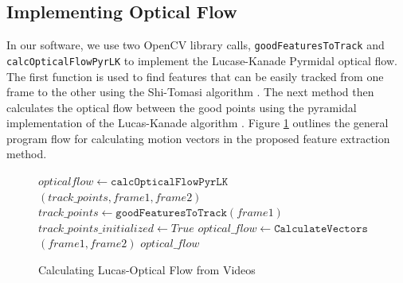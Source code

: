 %
%
%


\subsection{\label{subsection:vida_oflow} Implementing Optical Flow }
In our software, we use two OpenCV library calls, \texttt{goodFeaturesToTrack}
and \\
\texttt{calcOpticalFlowPyrLK} to implement the Lucase-Kanade Pyrmidal optical
flow. The first function is used to find features that can be easily tracked
from one frame to the other using the Shi-Tomasi algorithm \cite{shi1994good}.
The next method then calculates the optical flow between the good points using
the pyramidal implementation of the Lucas-Kanade algorithm
\cite{bouguet2001pyramidal}. Figure \ref{alg:lk_flow} outlines the general
program flow for calculating motion vectors in the proposed feature extraction method.

\begin{figure}[h]
\begin{algorithmic}[1]
  	\State $opticalflow \gets \texttt{calcOpticalFlowPyrLK}$
    \Statex $(track\_points, frame1, frame2)$
  \Else
  	\State $track\_points \gets \texttt{goodFeaturesToTrack}(frame1)$
	  \State $track\_points\_initialized \gets True$
	  \State $optical\_flow \gets  \texttt{CalculateVectors}$
    \Statex $(frame1, frame2)$
  \EndIf
  \Return $optical\_flow$
\EndProcedure
\end{algorithmic}
\caption{Calculating Lucas-Optical Flow from Videos}
\label{alg:lk_flow}
\end{figure}

